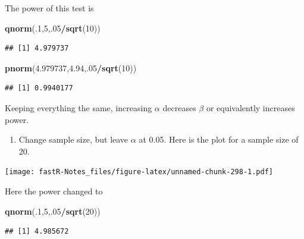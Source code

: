 \documentclass[]{book}
\newenvironment{Shaded}{\begin{snugshade}}{\end{snugshade}}
\newcommand{\KeywordTok}[1]{\textcolor[rgb]{0.13,0.29,0.53}{\textbf{#1}}}
\newcommand{\DecValTok}[1]{\textcolor[rgb]{0.00,0.00,0.81}{#1}}
\newcommand{\FloatTok}[1]{\textcolor[rgb]{0.00,0.00,0.81}{#1}}
\newcommand{\OperatorTok}[1]{\textcolor[rgb]{0.81,0.36,0.00}{\textbf{#1}}}
\newcommand{\NormalTok}[1]{#1}
\providecommand{\tightlist}{%
  \setlength{\itemsep}{0pt}\setlength{\parskip}{0pt}}
\theoremstyle{definition}
\theoremstyle{definition}
\theoremstyle{definition}
\theoremstyle{remark}
\begin{document}
The power of this test is

\begin{Shaded}
\begin{Highlighting}[]
\KeywordTok{qnorm}\NormalTok{(.}\DecValTok{1}\NormalTok{,}\DecValTok{5}\NormalTok{,.}\DecValTok{05}\OperatorTok{/}\KeywordTok{sqrt}\NormalTok{(}\DecValTok{10}\NormalTok{))}
\end{Highlighting}
\end{Shaded}

\begin{verbatim}
## [1] 4.979737
\end{verbatim}

\begin{Shaded}
\begin{Highlighting}[]
\KeywordTok{pnorm}\NormalTok{(}\FloatTok{4.979737}\NormalTok{,}\FloatTok{4.94}\NormalTok{,.}\DecValTok{05}\OperatorTok{/}\KeywordTok{sqrt}\NormalTok{(}\DecValTok{10}\NormalTok{))}
\end{Highlighting}
\end{Shaded}

\begin{verbatim}
## [1] 0.9940177
\end{verbatim}

Keeping everything the same, increasing \(\alpha\) decreases \(\beta\)
or equivalently increases power.

\begin{enumerate}
\def\labelenumi{\arabic{enumi}.}
\setcounter{enumi}{1}
\tightlist
\item
  Change sample size, but leave \(\alpha\) at 0.05. Here is the plot for
  a sample size of 20.
\end{enumerate}

\texttt{[image: fastR-Notes\_files/figure-latex/unnamed-chunk-298-1.pdf]}

Here the power changed to

\begin{Shaded}
\begin{Highlighting}[]
\KeywordTok{qnorm}\NormalTok{(.}\DecValTok{1}\NormalTok{,}\DecValTok{5}\NormalTok{,.}\DecValTok{05}\OperatorTok{/}\KeywordTok{sqrt}\NormalTok{(}\DecValTok{20}\NormalTok{))}
\end{Highlighting}
\end{Shaded}

\begin{verbatim}
## [1] 4.985672
\end{verbatim}
\end{document}
